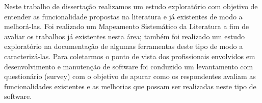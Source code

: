Neste trabalho de dissertação realizamos um estudo exploratório com objetivo de
entender as funcionalidade propostas na literatura e já existentes de modo a
melhorá-las. Foi realizado um Mapeamento Sistemático da Literatura a fim de
avaliar os trabalhos já existentes nesta área; também foi realizado um estudo
exploratório na documentação de algumas ferramentas deste tipo de modo a
caracterizá-las. Para coletarmos o ponto de vista dos profissionais envolvidos
em desenvolvimento e manutenção de software foi conduzido um levantamento com
questionário (survey) com o objetivo de apurar como os respondentes  avaliam as
funcionalidades existentes e as melhorias que possam ser realizadas neste tipo
de software.


